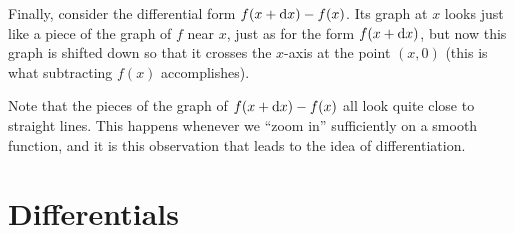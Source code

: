 \documentclass[12pt]{amsart}
\begin{document}
Finally, consider the differential form $f(x+\mathrm{d} x)-f(x)$.
Its graph at $x$ looks just like a piece of the graph of $f$ near $x$, just as for the form $f(x+\mathrm{d} x)$, but now this graph is shifted down so that it crosses the $x$-axis at the point $(x,0)$ (this is what subtracting $f(x)$ accomplishes).
\begin{center}
\end{center}
Note that the pieces of the graph of $f(x+\mathrm{d} x)-f(x)$ all look quite close to straight lines.
This happens whenever we ``zoom in'' sufficiently on a smooth function, and it is this observation that leads to the idea of differentiation.


\section{Differentials}
\label{sec:differentials}
\end{document}
